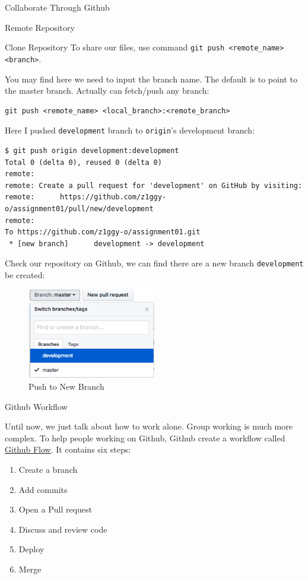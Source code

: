 \documentclass[10pt, a4papaer]{article}
\begin{document}
\begin{section}{Collaborate Through Github}
\begin{subsection}{Remote Repository}
\begin{subsubsection}{Clone Repository}
To share our files, use command \verb|git push <remote_name> <branch>|. 

You may find here we need to input the branch name. The default is to point to
the master branch. Actually can fetch/push any branch:
\begin{lstlisting}
git push <remote_name> <local_branch>:<remote_branch>
\end{lstlisting}

Here I pushed \verb|development| branch to \verb|origin|'s development branch:
\begin{lstlisting}
$ git push origin development:development
Total 0 (delta 0), reused 0 (delta 0)
remote:
remote: Create a pull request for 'development' on GitHub by visiting:
remote:      https://github.com/z1ggy-o/assignment01/pull/new/development
remote:
To https://github.com/z1ggy-o/assignment01.git
 * [new branch]      development -> development
\end{lstlisting}

Check our repository on Github, we can find there are a new branch \verb|development|
be created:
\begin{figure}[h]
    \centering
    \includegraphics[width=0.5\textwidth]{images/branches}
    \caption{Push to New Branch}
\end{figure}

\end{subsubsection}
\end{subsection}

\begin{subsection}{Github Workflow}

Until now, we just talk about how to work alone. Group working is much more complex.
To help people working on Github, Github create a workflow called
\href{https://guides.github.com/introduction/flow/}{\underline{Github Flow}}.
It contains six steps:
\begin{enumerate}
    \item Create a branch
    \item Add commits
    \item Open a Pull request
    \item Discuss and review code
    \item Deploy
    \item Merge
\end{enumerate}


\end{subsection}
\end{section}
\end{document}
